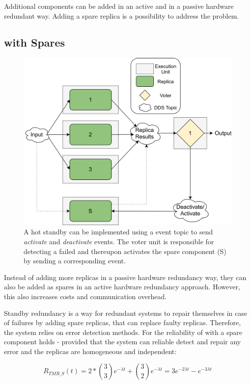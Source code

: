 Additional components can be added in an active and in a passive hardware redundant way.
Adding a spare replica is a possibility to address the \ChallengeWR problem.

\subsection{ with Spares}
\begin{figure}[!hb]
	\centering
	\includegraphics[width=0.8\linewidth]{images/TMRWithSparesDDS}
	\caption{A hot standby can be implemented using a  event topic to send \textit{activate} and \textit{deactivate} events. The voter unit is responsible for detecting a failed and thereupon activates the spare component (S) by sending a corresponding event.}
	\label{fig:TMRWithSparesDDS}
\end{figure}

Instead of adding more replicas in a passive hardware redundancy way, they can also be added as spares in an active hardware redundancy approach.
However, this also increases costs and communication overhead.

Standby redundancy is a way for redundant systems to repair themselves in case of failures by adding spare replicas, that can replace faulty replicas.
Therefore, the system relies on error detection methods.
For the reliability of  with a spare component holds - provided that the system can reliable detect and repair any error and the replicas are homogeneous and independent:

\begin{equation}
R_{TMR\_S}(t) = 2 * {3 \choose 3} e^{-\lambda t} + {3 \choose 2} e^{-\lambda t}
 = 3e^{-2 \lambda t} - e^{-3 \lambda t}
\end{equation}

